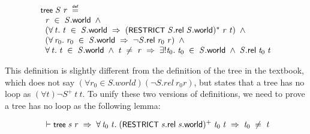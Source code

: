 \documentclass[letterpaper]{article}
\renewcommand{\HOLConst}[1]{{\textsf{\upshape\small #1}}}
\newenvironment{holmath}{\begin{displaymath}\begin{array}{l}}{\end{array}\end{displaymath}\ignorespacesafterend}
\begin{document}
\begin{holmath}
  \HOLConst{tree}\;\HOLFreeVar{S}\;\HOLFreeVar{r}\;\HOLSymConst{\HOLTokenDefEquality{}}\\
\;\;\HOLFreeVar{r}\;\HOLSymConst{\HOLTokenIn{}}\;\HOLFreeVar{S}.\HOLFieldName{world}\;\HOLSymConst{\HOLTokenConj{}}\\
\;\;(\HOLSymConst{\HOLTokenForall{}}\HOLBoundVar{t}.\;\HOLBoundVar{t}\;\HOLSymConst{\HOLTokenIn{}}\;\HOLFreeVar{S}.\HOLFieldName{world}\;\HOLSymConst{\HOLTokenImp{}}\;(\HOLConst{RESTRICT}\;\HOLFreeVar{S}.\HOLFieldName{rel}\;\HOLFreeVar{S}.\HOLFieldName{world})\HOLSymConst{\HOLTokenSupStar{}}\;\HOLFreeVar{r}\;\HOLBoundVar{t})\;\HOLSymConst{\HOLTokenConj{}}\\
\;\;(\HOLSymConst{\HOLTokenForall{}}\HOLBoundVar{r\sb{\mathrm{0}}}.\;\HOLBoundVar{r\sb{\mathrm{0}}}\;\HOLSymConst{\HOLTokenIn{}}\;\HOLFreeVar{S}.\HOLFieldName{world}\;\HOLSymConst{\HOLTokenImp{}}\;\HOLSymConst{\HOLTokenNeg{}}\HOLFreeVar{S}.\HOLFieldName{rel}\;\HOLBoundVar{r\sb{\mathrm{0}}}\;\HOLFreeVar{r})\;\HOLSymConst{\HOLTokenConj{}}\\
\;\;\HOLSymConst{\HOLTokenForall{}}\HOLBoundVar{t}.\;\HOLBoundVar{t}\;\HOLSymConst{\HOLTokenIn{}}\;\HOLFreeVar{S}.\HOLFieldName{world}\;\HOLSymConst{\HOLTokenConj{}}\;\HOLBoundVar{t}\;\HOLSymConst{\HOLTokenNotEqual{}}\;\HOLFreeVar{r}\;\HOLSymConst{\HOLTokenImp{}}\;\HOLSymConst{\HOLTokenUnique{}}\HOLBoundVar{t\sb{\mathrm{0}}}.\;\HOLBoundVar{t\sb{\mathrm{0}}}\;\HOLSymConst{\HOLTokenIn{}}\;\HOLFreeVar{S}.\HOLFieldName{world}\;\HOLSymConst{\HOLTokenConj{}}\;\HOLFreeVar{S}.\HOLFieldName{rel}\;\HOLBoundVar{t\sb{\mathrm{0}}}\;\HOLBoundVar{t}
\end{holmath}

This definition is slightly different from the definition of the tree in the textbook, which does not say $(\forall r_0 \in S.world)(\lnot S.rel \ r_0 r)$, but states that a tree has no loop as $(\forall t) \lnot S^+ \ t \ t$. To unify these two versions of definitions, we need to prove a tree has no loop as the following lemma:

\begin{holmath}
  \ensuremath{\HOLTokenTurnstile}\HOLConst{tree}\;\HOLFreeVar{s}\;\HOLFreeVar{r}\;\HOLSymConst{\HOLTokenImp{}}\;\HOLSymConst{\HOLTokenForall{}}\HOLBoundVar{t\sb{\mathrm{0}}}\;\HOLBoundVar{t}.\;(\HOLConst{RESTRICT}\;\HOLFreeVar{s}.\HOLFieldName{rel}\;\HOLFreeVar{s}.\HOLFieldName{world})\HOLSymConst{\HOLTokenSupPlus{}}\;\HOLBoundVar{t\sb{\mathrm{0}}}\;\HOLBoundVar{t}\;\HOLSymConst{\HOLTokenImp{}}\;\HOLBoundVar{t\sb{\mathrm{0}}}\;\HOLSymConst{\HOLTokenNotEqual{}}\;\HOLBoundVar{t}
\end{holmath}
\end{document}
